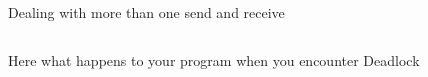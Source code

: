 \documentclass[xcolor={svgnames,usenames}]{beamer}
\begin{document}
\begin{frame}[fragile]{Dealing with more than one send and receive}
\begin{columns}
\begin{column}{0.30\columnwidth}
{Here what happens to your program when you encounter Deadlock
}
\end{column}
\end{columns}
\end{frame}
\end{document}
